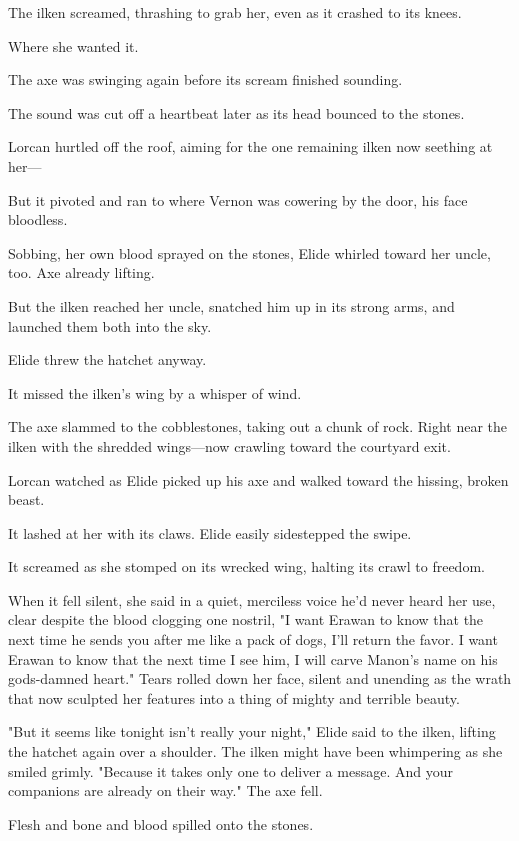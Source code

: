 The ilken screamed, thrashing to grab her, even as it crashed to its knees.

Where she wanted it.

The axe was swinging again before its scream finished sounding.

The sound was cut off a heartbeat later as its head bounced to the stones.

Lorcan hurtled off the roof, aiming for the one remaining ilken now seething at her---

But it pivoted and ran to where Vernon was cowering by the door, his face bloodless.

Sobbing, her own blood sprayed on the stones, Elide whirled toward her uncle, too. Axe already lifting.

But the ilken reached her uncle, snatched him up in its strong arms, and launched them both into the sky.

Elide threw the hatchet anyway.

It missed the ilken's wing by a whisper of wind.

The axe slammed to the cobblestones, taking out a chunk of rock. Right near the ilken with the shredded wings---now crawling toward the courtyard exit.

Lorcan watched as Elide picked up his axe and walked toward the hissing, broken beast.

It lashed at her with its claws. Elide easily sidestepped the swipe.

It screamed as she stomped on its wrecked wing, halting its crawl to freedom.

When it fell silent, she said in a quiet, merciless voice he'd never heard her use, clear despite the blood clogging one nostril, "I want Erawan to know that the next time he sends you after me like a pack of dogs, I'll return the favor. I want Erawan to know that the next time I see him, I will carve Manon's name on his gods-damned heart." Tears rolled down her face, silent and unending as the wrath that now sculpted her features into a thing of mighty and terrible beauty.

"But it seems like tonight isn't really your night," Elide said to the ilken, lifting the hatchet again over a shoulder. The ilken might have been whimpering as she smiled grimly. "Because it takes only one to deliver a message. And your companions are already on their way." The axe fell.

Flesh and bone and blood spilled onto the stones.

